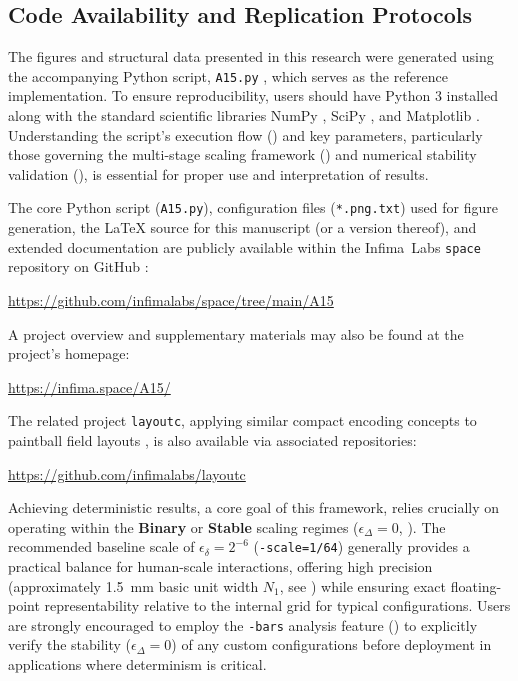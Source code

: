 \documentclass[10pt]{article}
\def\IL{Infima~Labs}
\begin{document}
\subsection{Code Availability and Replication Protocols}\label{subsec-replication}

The figures and structural data presented in this research were generated using the accompanying Python script, \texttt{A15.py} \cite{Risinger2024A15}, which serves as the reference implementation. To ensure reproducibility, users should have Python 3 installed along with the standard scientific libraries NumPy \cite{Harris2020}, SciPy \cite{Virtanen2020}, and Matplotlib \cite{Hunter2007}. Understanding the script's execution flow () and key parameters, particularly those governing the multi-stage scaling framework () and numerical stability validation (), is essential for proper use and interpretation of results.

The core Python script (\texttt{A15.py}), configuration files (\texttt{*.png.txt}) used for figure generation, the LaTeX source for this manuscript (or a version thereof), and extended documentation are publicly available within the \IL{} \texttt{space} repository on GitHub \cite{InfimaSpace}:
\begin{center}
    \url{https://github.com/infimalabs/space/tree/main/A15}
\end{center}
A project overview and supplementary materials may also be found at the project's homepage:
\begin{center}
    \url{https://infima.space/A15/}
\end{center}
The related project \texttt{layoutc}, applying similar compact encoding concepts to paintball field layouts \cite{Risinger2024Layoutc}, is also available via associated repositories:
\begin{center}
    \url{https://github.com/infimalabs/layoutc}
\end{center}

Achieving deterministic results, a core goal of this framework, relies crucially on operating within the \textbf{Binary} or \textbf{Stable} scaling regimes ($\epsilon_\Delta = 0$, ). The recommended baseline scale of $\epsilon_\delta = 2^{-6}$ (\texttt{-scale=1/64}) generally provides a practical balance for human-scale interactions, offering high precision (approximately \SI{1.5}{\milli\meter} basic unit width $N_1$, see ) while ensuring exact floating-point representability relative to the internal grid for typical configurations. Users are strongly encouraged to employ the \texttt{-bars} analysis feature () to explicitly verify the stability ($\epsilon_\Delta = 0$) of any custom configurations before deployment in applications where determinism is critical.
\end{document}
